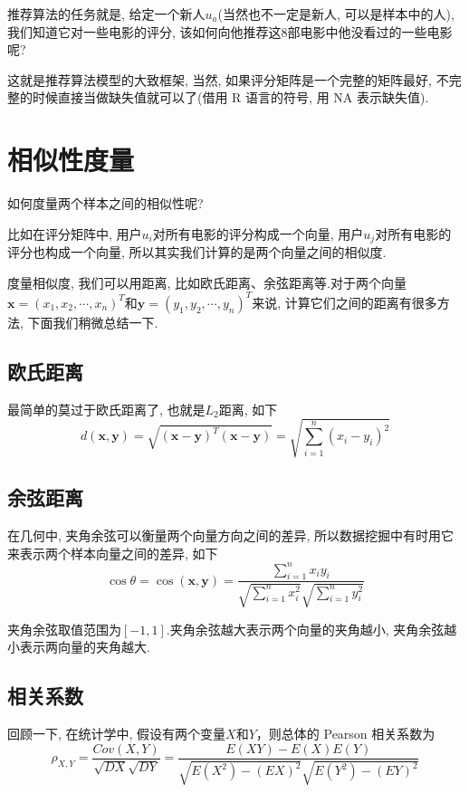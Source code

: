 \documentclass[a4paper,UTF8]{ctexart}
\theoremstyle{plain} \newtheorem{theorem}{定理}[section]
\theoremstyle{plain} \newtheorem{definition}{定义}[section]
\theoremstyle{plain} \newtheorem{lemma}{引理}[section]
\theoremstyle{plain} \newtheorem{proposition}{命题}[section]
\theoremstyle{plain} \newtheorem{example}{例}[section]
\theoremstyle{plain} \newtheorem{remark}{注}[section]
\theoremstyle{plain} \newtheorem{corollary}{推论}[section]
\begin{document}
推荐算法的任务就是, 给定一个新人$u_{a}$(当然也不一定是新人, 可以是样本中的人), 我们知道它对一些电影的评分, 该如何向他推荐这$8$部电影中他没看过的一些电影呢?

这就是推荐算法模型的大致框架, 当然, 如果评分矩阵是一个完整的矩阵最好, 不完整的时候直接当做缺失值就可以了(借用 R 语言的符号, 用 NA 表示缺失值).



\section{相似性度量}
如何度量两个样本之间的相似性呢?

比如在评分矩阵中, 用户$u_{i}$对所有电影的评分构成一个向量, 用户$u_{j}$对所有电影的评分也构成一个向量, 所以其实我们计算的是两个向量之间的相似度.

度量相似度, 我们可以用距离, 比如欧氏距离、余弦距离等.对于两个向量$\bm{x} = (x_1,x_2,\cdots,x_n)^{T}$和$\bm{y} = (y_1,y_2,\cdots,y_n)^{T}$来说, 计算它们之间的距离有很多方法, 下面我们稍微总结一下.

\subsection{欧氏距离}
最简单的莫过于欧氏距离了, 也就是$L_{2}$距离, 如下
\begin{equation*}
d(\bm{x},\bm{y}) = \sqrt{(\bm{x} - \bm{y})^{T} (\bm{x} - \bm{y})} = \sqrt{ \sum_{i=1}^{n} (x_{i} - y_{i})^2 }
\end{equation*}


\subsection{余弦距离}
在几何中, 夹角余弦可以衡量两个向量方向之间的差异, 所以数据挖掘中有时用它来表示两个样本向量之间的差异, 如下
\begin{equation*}
\cos \theta = \cos (\bm{x}, \bm{y}) = \frac{\sum\limits_{i=1}^{n} x_i y_i}{\sqrt{\sum\limits_{i=1}^{n} x_{i}^2} \sqrt{\sum\limits_{i=1}^{n}y_{i}^2}}
\end{equation*}

夹角余弦取值范围为$[-1,1]$.夹角余弦越大表示两个向量的夹角越小, 夹角余弦越小表示两向量的夹角越大.


\subsection{相关系数}
回顾一下, 在统计学中, 假设有两个变量$X$和$Y$，则总体的 Pearson 相关系数为
\begin{equation*}
\rho_{X,Y} = \frac{Cov(X,Y)}{\sqrt{DX}\sqrt{DY}} = \frac{E(XY)-E(X)E(Y)}{\sqrt{E(X^2)-(EX)^2}\sqrt{E(Y^2)-(EY)^2}}
\end{equation*}
\end{document}
